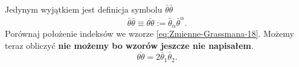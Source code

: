 \documentclass[a4paper,11pt]{article}
\begin{document}
Jedynym wyjątkiem jest definicja symbolu $\bar{\theta} \bar{\theta}$
\begin{equation}
  \label{eq:17}
  \bar{\theta} \bar{\theta} \equiv \overline{\theta \theta}
  := \bar{\theta}_{ \dot{ \alpha } } \bar{\theta}^{ \dot{ \alpha } }.
\end{equation}
Porównaj położenie indeksów we wzorze \eqref{eq:Zmienne-Grassmana-18}. Możemy teraz obliczyć \textbf{nie możemy bo wzorów jeszcze nie napisałem}.
\begin{equation}
  \label{eq:18}
  \overline{\theta \theta} = 2 \bar{\theta}_{ \dot{ 1 } } \bar{\theta}_{ \dot{ 2 } }.
\end{equation}









{}






\end{document}
